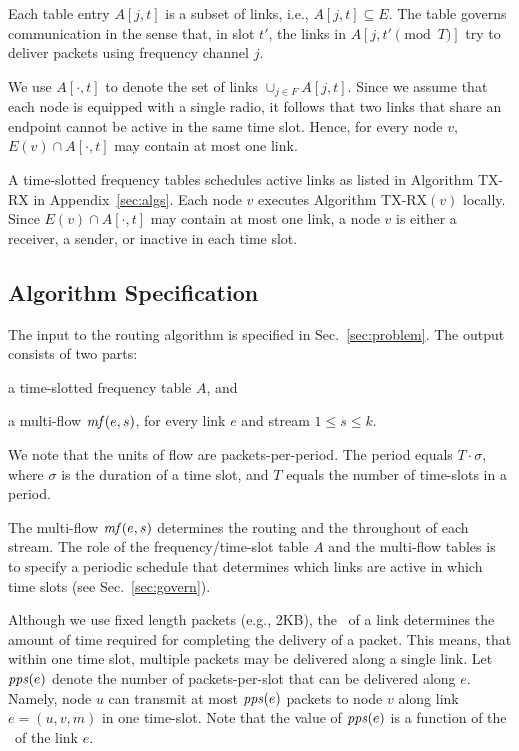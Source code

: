 \documentclass[11pt]{article}
\newenvironment{proof sketch}[1]{\noindent {\emph{Proof sketch of #1:}}}{\hfill \qed}
\newcommand{\pps}{\text{\emph{pps}}}
\newcommand{\mf}{\text{\emph{mf}}}
\newcommand{\MCS}{\text{\sc{mcs}}}
\begin{document}
Each table entry $A[j,t]$ is a subset of links, i.e., $A[j,t]\subseteq
E$.  The table governs communication in the sense that, in slot $t'$,
the links in $A[j,t' \pmod T]$ try to deliver packets using frequency
channel $j$.

We use $A[\cdot,t]$ to denote the set of links $\cup_{j\in F} A[j,t]$.
Since we assume that each node is equipped with a single radio, it
follows that two links that share an endpoint cannot be active in the
same time slot.  Hence, for every node $v$, $E(v) \cap A[\cdot ,t]$
may contain at most one link.

A time-slotted frequency tables schedules active links as listed in
Algorithm TX-RX in Appendix~\ref{sec:algs}.  Each node $v$ executes
Algorithm TX-RX$(v)$ locally.  Since $E(v) \cap A[\cdot ,t]$ may
contain at most one link, a node $v$ is either a receiver, a sender,
or inactive in each time slot.

\subsection{Algorithm Specification}
The input to the routing algorithm is specified in
Sec.~\ref{sec:problem}.  The output consists of two parts:
\begin{inparaenum}[(i)]
\item a time-slotted frequency table $A$, and
\item a multi-flow $\mf(e,s)$, for every link $e$ and stream $1\leq
  s\leq k$.
\end{inparaenum}
We note that the units of flow are packets-per-period. The period
equals $T \cdot \sigma$, where $\sigma$ is the duration of a time
slot, and $T$ equals the number of time-slots in a period.

The multi-flow $\mf(e,s)$ determines the routing and the throughout of
each stream. The role of the frequency/time-slot table $A$ and the
multi-flow tables is to specify a periodic schedule that determines
which links are active in which time slots (see
Sec.~\ref{sec:govern}).

Although we use fixed length packets (e.g., 2KB), the \MCS\ of a link
determines the amount of time required for completing the delivery of
a packet.  This means, that within one time slot, multiple packets may
be delivered along a single link.  Let $\pps(e)$ denote the number of
packets-per-slot that can be delivered along $e$.  Namely, node $u$
can transmit at most $\pps(e)$ packets to node $v$ along link
$e=(u,v,m)$ in one time-slot. Note that the value of $\pps(e)$ is a
function of the \MCS\ of the link $e$.
\end{document}
